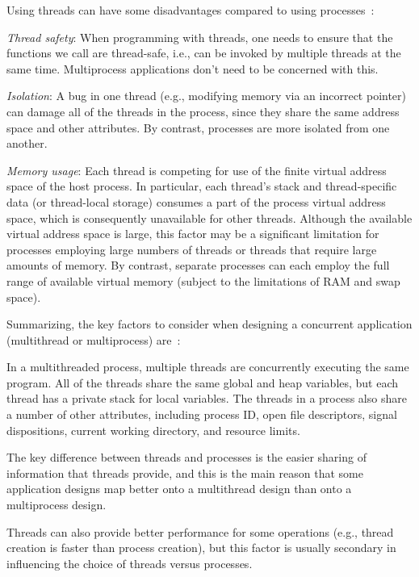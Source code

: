 Using threads can have some disadvantages compared to using
processes~\cite{kerrisk2010linux}:
\begin{item-c}
\item  \emph{Thread safety}: When programming with threads, one needs to ensure
  that the functions we call are thread-safe, i.e., can be invoked by multiple
  threads at the same time. Multiprocess applications don't need to be concerned
  with this.
\item \emph{Isolation}: A bug in one thread (e.g., modifying memory via an
  incorrect pointer) can damage all of the threads in the process, since they
  share the same address space and other attributes. By contrast, processes are
  more isolated from one another.
\item \emph{Memory usage}: Each thread is competing for use of the finite
  virtual address space of the host process. In particular, each thread’s stack
  and thread-specific data (or thread-local storage) consumes a part of the
  process virtual address space, which is consequently unavailable for other
  threads. Although the available virtual address space is large, this factor
  may be a significant limitation for processes employing large numbers of
  threads or threads that require large amounts of memory.
  By contrast, separate processes can each employ the full range of available
  virtual memory (subject to the limitations of RAM and swap space).
\end{item-c}

Summarizing, the key factors to consider when designing a concurrent application
(multithread or multiprocess) are~\cite{kerrisk2010linux}:
\begin{item-c}
\item In a multithreaded process, multiple threads are concurrently executing
  the same program. All of the threads share the same global and heap variables,
  but each thread has a private stack for local variables. The threads in a
  process also share a number of other attributes, including process ID, open
  file descriptors, signal dispositions, current working directory, and resource
  limits.
\item The key difference between threads and processes is the easier sharing of
information that threads provide, and this is the main reason that some
application designs map better onto a multithread design than onto a
multiprocess design.
\item Threads can also provide better performance for some operations (e.g.,
  thread creation is faster than process creation), but this factor is usually
  secondary in influencing the choice of threads versus processes.
\end{item-c}

